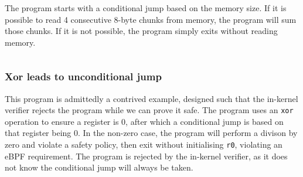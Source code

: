 The program starts with a conditional jump based on the memory size. If it is possible to read 4 consecutive 8-byte chunks from memory, the program will sum those chunks. If it is not possible, the program simply exits without reading memory. 

\inputminted[linenos]{asm}{programs/load4times_safe.asm}


\subsubsection{Xor leads to unconditional jump}
\label{prog:xor_jump}
This program is admittedly a contrived example, designed such that the in-kernel verifier rejects the program while we can prove it safe. 
The program uses an \texttt{xor} operation to ensure a register is 0, after which a conditional jump is based on that register being 0. In the non-zero case, the program will perform a divison by zero and violate a safety policy, then exit without initialising \texttt{r0}, violating an eBPF requirement.
The program is rejected by the in-kernel verifier, as it does not know the conditional jump will always be taken.



\inputminted[linenos]{asm}{programs/xor_jump.asm}





